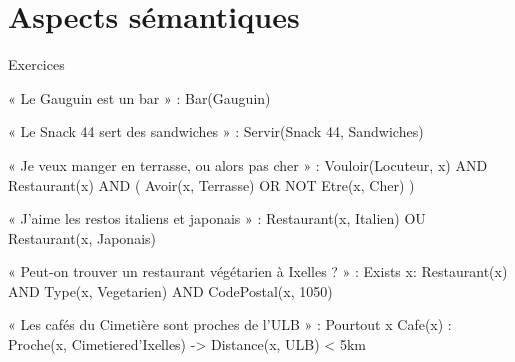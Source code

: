 \vspace{-1.2cm}

\section{Aspects sémantiques}


Exercices

« Le Gauguin est un bar » : Bar(Gauguin)

« Le Snack 44 sert des sandwiches » : Servir(Snack 44, Sandwiches)

« Je veux manger en terrasse, ou alors pas cher » : Vouloir(Locuteur, x) AND Restaurant(x) AND ( Avoir(x, Terrasse) OR NOT Etre(x, Cher) )

« J'aime les restos italiens et japonais » : Restaurant(x, Italien) OU Restaurant(x, Japonais)

« Peut-on trouver un restaurant végétarien à Ixelles ? » : Exists x: Restaurant(x) AND Type(x, Vegetarien) AND CodePostal(x, 1050)

« Les cafés du Cimetière sont proches de l'ULB » : Pourtout x Cafe(x) : Proche(x, Cimetiered'Ixelles) -> Distance(x, ULB) < 5km
